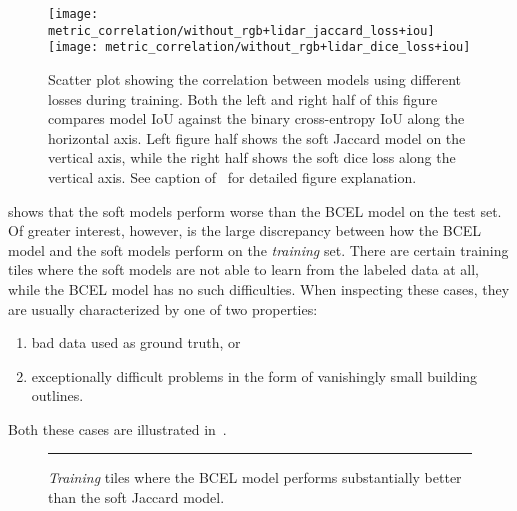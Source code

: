\begin{figure}[H]
  \centering
  \texttt{[image: metric\_correlation/without\_rgb+lidar\_jaccard\_loss+iou]}
  \textcolor{gray}{\vrule}
  \texttt{[image: metric\_correlation/without\_rgb+lidar\_dice\_loss+iou]}
  \caption{%
    Scatter plot showing the correlation between models using different losses during training.
    Both the left and right half of this figure compares model IoU against the binary cross-entropy IoU along the horizontal axis.
    Left figure half shows the soft Jaccard model on the vertical axis, while the right half shows the soft dice loss along the vertical axis.
    See caption of~ for detailed figure explanation.
  }%
  \label{fig:soft-correlations}
\end{figure}
\vspace{-0.5\baselineskip}
 shows that the soft models perform worse than the BCEL model on the test set.
Of greater interest, however, is  the large discrepancy between how the BCEL model and the soft models perform on the \emph{training} set.
There are certain training tiles where the soft models are not able to learn from the labeled data at all, while the BCEL model has no such difficulties.
When inspecting these cases, they are usually characterized by one of two properties:
\begin{enumerate}[nosep,label=\arabic*)]
  \item bad data used as ground truth, or\textellipsis
  \item exceptionally difficult problems in the form of vanishingly small building outlines.
\end{enumerate}
Both these cases are illustrated in~.

\begin{figure}[H]
  \centering
  \rule[1ex]{\textwidth}{.5pt}
  \caption{%
    \emph{Training} tiles where the BCEL model performs substantially better than the soft Jaccard model.
  }%
  \label{fig:soft-training-failures}
\end{figure}

